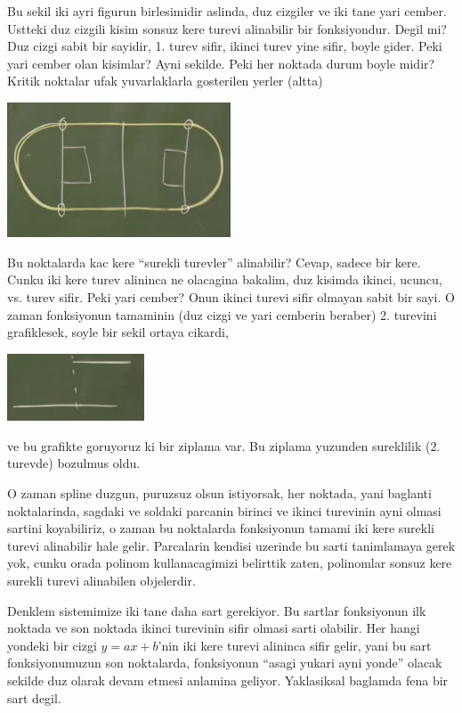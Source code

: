 \documentclass[12pt,fleqn]{article}\usepackage{common}
\begin{document}
Bu sekil iki ayri figurun birlesimidir aslinda, duz cizgiler ve iki tane
yari cember. Ustteki duz cizgili kisim sonsuz kere turevi alinabilir bir
fonksiyondur. Degil mi? Duz cizgi sabit bir sayidir, 1. turev sifir, ikinci
turev yine sifir, boyle gider. Peki yari cember olan kisimlar? Ayni
sekilde. Peki her noktada durum boyle midir? Kritik noktalar ufak
yuvarlaklarla gosterilen yerler (altta)

\includegraphics[height=4cm]{spline7.png}

Bu noktalarda kac kere ``surekli turevler'' alinabilir? Cevap, sadece bir
kere. Cunku iki kere turev alininca ne olacagina bakalim, duz kisimda
ikinci, ucuncu, vs. turev sifir. Peki yari cember? Onun ikinci turevi sifir
olmayan sabit bir sayi. O zaman fonksiyonun tamaminin (duz cizgi ve yari
cemberin beraber) 2. turevini grafiklesek, soyle bir sekil ortaya cikardi,

\includegraphics[height=2cm]{spline8.png}

ve bu grafikte goruyoruz ki bir ziplama var. Bu ziplama yuzunden sureklilik
(2. turevde) bozulmus oldu.

O zaman spline duzgun, puruzsuz olsun istiyorsak, her noktada, yani
baglanti noktalarinda, sagdaki ve soldaki parcanin birinci ve ikinci
turevinin ayni olmasi sartini koyabiliriz, o zaman bu noktalarda
fonksiyonun tamami iki kere surekli turevi alinabilir hale
gelir. Parcalarin kendisi uzerinde bu sarti tanimlamaya gerek yok, cunku
orada polinom kullanacagimizi belirttik zaten, polinomlar sonsuz kere
surekli turevi alinabilen objelerdir. 

Denklem sistemimize iki tane daha sart gerekiyor. Bu sartlar fonksiyonun
ilk noktada ve son noktada ikinci turevinin sifir olmasi sarti
olabilir. Her hangi yondeki bir cizgi $y = ax + b$'nin iki kere turevi
alininca sifir gelir, yani bu sart fonksiyonumuzun son noktalarda,
fonksiyonun ``asagi yukari ayni yonde'' olacak sekilde duz olarak devam
etmesi anlamina geliyor. Yaklasiksal baglamda fena bir sart degil. 
\end{document}
